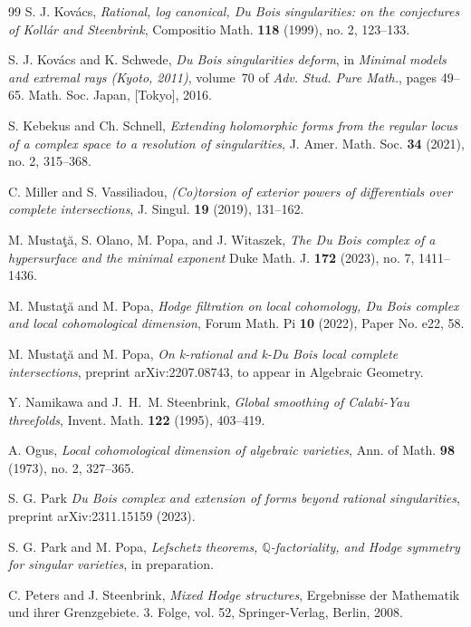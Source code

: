 \documentclass[11pt]{amsart}
\theoremstyle{definition}
\theoremstyle{plain}
\newcommand{\QQ}{\mathbb Q}
\begin{document}
\begin{thebibliography}{99}
S. J. Kov\'{a}cs, \emph{ Rational, log canonical, Du Bois singularities: on the conjectures of Koll\'{a}r and Steenbrink},  Compositio Math. \textbf{118} (1999), no. 2, 123–133.

S. J. Kov\'{a}cs and K. Schwede, \emph{ Du {B}ois singularities deform}, in {\em Minimal models and extremal rays ({K}yoto, 2011)}, volume~70
  of {\em Adv. Stud. Pure Math.}, pages 49--65. Math. Soc. Japan, [Tokyo], 2016.

S. Kebekus and Ch. Schnell, \emph{ Extending holomorphic forms from the regular locus of a complex space
  to a resolution of singularities}, J. Amer. Math. Soc. \textbf{34} (2021), no. 2, 315--368.

C. Miller and S. Vassiliadou, \emph{ ({C}o)torsion of exterior powers of differentials over complete
  intersections}, J. Singul. \textbf{19} (2019), 131--162.

M. Musta\c{t}\u{a}, S. Olano, M. Popa, and J. Witaszek, \emph{The {D}u {B}ois complex of a hypersurface and the minimal exponent}
Duke Math. J. \textbf{172} (2023), no. 7, 1411--1436.

M. Musta\c{t}\u{a} and M. Popa, \emph{ Hodge filtration on local cohomology, {D}u {B}ois complex and local
  cohomological dimension}, Forum Math. Pi  \textbf{10} (2022), Paper No. e22, 58.

M. Musta\c t\u a and M. Popa, \emph{ On k-rational and k-{D}u {B}ois local complete intersections}, preprint arXiv:2207.08743, to appear in 
Algebraic Geometry.

Y. Namikawa and J.~H.~M. Steenbrink, \emph{ Global smoothing of Calabi-Yau threefolds}, 
Invent. Math. \textbf{122} (1995), 403--419.

A. Ogus, \emph{Local cohomological dimension of algebraic varieties}, Ann. of Math. \textbf{98}  (1973), no. 2, 327--365.

S. G. Park \emph{Du Bois complex and extension of forms beyond rational singularities}, 
preprint arXiv:2311.15159  (2023).

S. G. Park and M. Popa, \emph{Lefschetz theorems, $\QQ$-factoriality, and Hodge symmetry for singular varieties}, in preparation.

C. Peters and J. Steenbrink, \emph{Mixed Hodge structures}, Ergebnisse der Mathematik und ihrer Grenzgebiete. 3. Folge, vol. 52, Springer-Verlag, Berlin, 2008.


\end{thebibliography}
\end{document}
